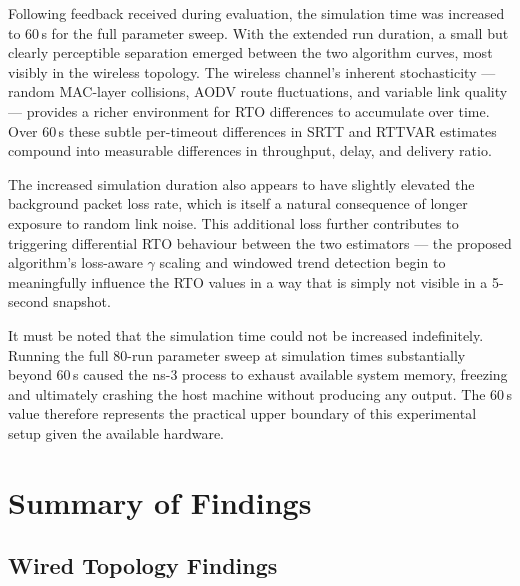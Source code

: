 \documentclass[12pt,a4paper]{report}
\begin{document}
Following feedback received during evaluation, the simulation time was
increased to 60\,s for the full parameter sweep.  With the extended run
duration, a small but clearly perceptible separation emerged between the
two algorithm curves, most visibly in the wireless topology.  The wireless
channel's inherent stochasticity --- random MAC-layer collisions, AODV
route fluctuations, and variable link quality --- provides a richer
environment for RTO differences to accumulate over time.  Over 60\,s these
subtle per-timeout differences in SRTT and RTTVAR estimates compound into
measurable differences in throughput, delay, and delivery ratio.

The increased simulation duration also appears to have slightly elevated
the background packet loss rate, which is itself a natural consequence of
longer exposure to random link noise.  This additional loss further
contributes to triggering differential RTO behaviour between the two
estimators --- the proposed algorithm's loss-aware $\gamma$ scaling and
windowed trend detection begin to meaningfully influence the RTO values
in a way that is simply not visible in a 5-second snapshot.

It must be noted that the simulation time could not be increased
indefinitely.  Running the full 80-run parameter sweep at simulation times
substantially beyond 60\,s caused the ns-3 process to exhaust available
system memory, freezing and ultimately crashing the host machine without
producing any output.  The 60\,s value therefore represents the practical
upper boundary of this experimental setup given the available hardware.

\chapter{Summary of Findings}
\label{ch:summary}

\section{Wired Topology Findings}
\end{document}
